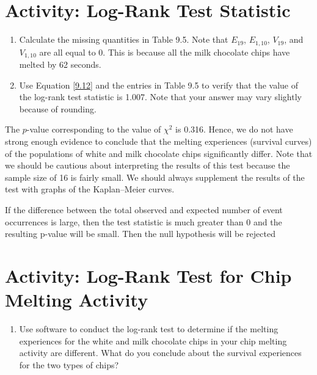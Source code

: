 \documentclass[
]{report}
\providecommand{\tightlist}{%
  \setlength{\itemsep}{0pt}\setlength{\parskip}{0pt}}
\begin{document}
\section*{Activity: Log-Rank Test Statistic}\label{activity-log-rank-test-statistic}

\begin{enumerate}
\def\labelenumi{\arabic{enumi}.}
\setcounter{enumi}{33}
\tightlist
\item
  Calculate the missing quantities in Table 9.5. Note that \(E_{19}\), \(E_{1,10}\), \(V_{19}\), and \(V_{1,10}\) are all equal to 0. This is because all the milk chocolate chips have melted by 62 seconds.\\
\item
  Use Equation \ref{9.12} and the entries in Table 9.5 to verify that the value of the log-rank test statistic is 1.007. Note that your answer may vary slightly because of rounding.
\end{enumerate}

The \(p\)-value corresponding to the value of \(\chi^2\) is 0.316. Hence, we do not have strong enough evidence to conclude that the melting experiences (survival curves) of the populations of white and milk chocolate chips significantly differ. Note that we should be cautious about interpreting the results of this test because the sample size of 16 is fairly small. We should always supplement the results of the test with graphs of the Kaplan--Meier curves.

If the difference between the total observed and expected number of event occurrences is large, then the
test statistic is much greater than 0 and the resulting p-value will be small. Then the null hypothesis will be
rejected

\section*{Activity: Log-Rank Test for Chip Melting Activity}\label{activity-log-rank-test-for-chip-melting-activity}

\begin{enumerate}
\def\labelenumi{\arabic{enumi}.}
\setcounter{enumi}{35}
\tightlist
\item
  Use software to conduct the log-rank test to determine if the melting experiences for the white and milk chocolate chips in your chip melting activity are different. What do you conclude about the survival experiences for the two types of chips?
\end{enumerate}
\end{document}
